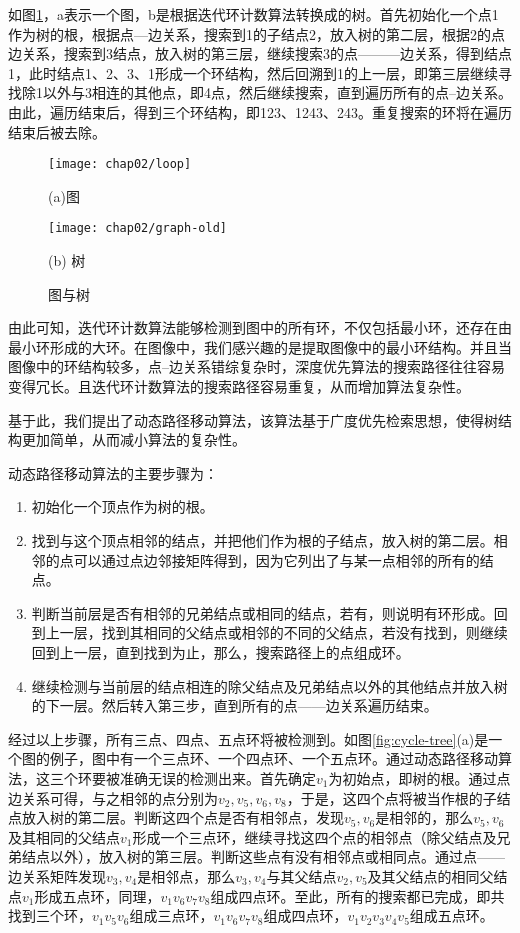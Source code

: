 如图\ref{fig:graph-tree}，a表示一个图，b是根据迭代环计数算法转换成的树。首先初始化一个点1作为树的根，根据点---边关系，搜索到1的子结点2，放入树的第二层，根据2的点边关系，搜索到3结点，放入树的第三层，继续搜索3的点———边关系，得到结点1，此时结点1、2、3、1形成一个环结构，然后回溯到1的上一层，即第三层继续寻找除1以外与3相连的其他点，即4点，然后继续搜索，直到遍历所有的点--边关系。由此，遍历结束后，得到三个环结构，即123、1243、243。重复搜索的环将在遍历结束后被去除。
\begin{figure}[H]
\centering
  \begin{minipage}[b]{0.48\textwidth} 
      \centering 
      \texttt{[image: chap02/loop]}
        \centerline{(a)图}\medskip
    \end{minipage}
  \begin{minipage}[b]{0.48\textwidth}
    \centering
    \texttt{[image: chap02/graph-old]}
      \centerline{(b) 树}\medskip
  \end{minipage}
\caption{图与树}
\label{fig:graph-tree}
\end{figure}

由此可知，迭代环计数算法能够检测到图中的所有环，不仅包括最小环，还存在由最小环形成的大环。在图像中，我们感兴趣的是提取图像中的最小环结构。并且当图像中的环结构较多，点--边关系错综复杂时，深度优先算法的搜索路径往往容易变得冗长。且迭代环计数算法的搜索路径容易重复，从而增加算法复杂性。

基于此，我们提出了动态路径移动算法，该算法基于广度优先检索思想，使得树结构更加简单，从而减小算法的复杂性。

动态路径移动算法的主要步骤为：
\begin{enumerate}
\item 初始化一个顶点作为树的根。
\item 找到与这个顶点相邻的结点，并把他们作为根的子结点，放入树的第二层。相邻的点可以通过点边邻接矩阵得到，因为它列出了与某一点相邻的所有的结点。
\item 判断当前层是否有相邻的兄弟结点或相同的结点，若有，则说明有环形成。回到上一层，找到其相同的父结点或相邻的不同的父结点，若没有找到，则继续回到上一层，直到找到为止，那么，搜索路径上的点组成环。
\item 继续检测与当前层的结点相连的除父结点及兄弟结点以外的其他结点并放入树的下一层。然后转入第三步，直到所有的点——边关系遍历结束。
\end{enumerate}
经过以上步骤，所有三点、四点、五点环将被检测到。如图\ref{fig:cycle-tree}(a)是一个图的例子，图中有一个三点环、一个四点环、一个五点环。通过动态路径移动算法，这三个环要被准确无误的检测出来。首先确定$v_1$为初始点，即树的根。通过点边关系可得，与之相邻的点分别为$v_2, v_5, v_6, v_8$，于是，这四个点将被当作根的子结点放入树的第二层。判断这四个点是否有相邻点，发现$v_5, v_6$是相邻的，那么$v_5, v_6$及其相同的父结点$v_1$形成一个三点环，继续寻找这四个点的相邻点（除父结点及兄弟结点以外），放入树的第三层。判断这些点有没有相邻点或相同点。通过点——边关系矩阵发现$v_3,v_4$是相邻点，那么$v_3,v_4$与其父结点$v_2,v_5$及其父结点的相同父结点$v_1$形成五点环，同理，$v_{1}v_{6}v_{7}v_{8}$组成四点环。至此，所有的搜索都已完成，即共找到三个环，$v_{1}v_{5}v_{6}$组成三点环，$v_{1}v_{6}v_{7}v_{8}$组成四点环，$v_{1}v_{2}v_{3}v_{4}v_{5}$组成五点环。

